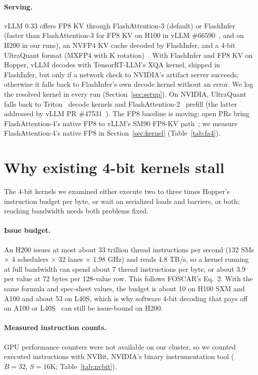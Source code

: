 \documentclass[11pt]{article}
\begin{document}
\paragraph{Serving.} vLLM 0.33 offers FP8 KV through FlashAttention-3 (default) or FlashInfer (faster than FlashAttention-3 for FP8 KV on H100 in vLLM \#66590~\cite{vllm66590}, and on H200 in our runs), an NVFP4 KV cache decoded by FlashInfer, and a 4-bit UltraQuant format (MXFP4 with K rotation)~\cite{chakrabarti2026ultraquant}. With FlashInfer and FP8 KV on Hopper, vLLM decodes with TensorRT-LLM's XQA kernel, shipped in FlashInfer, but only if a network check to NVIDIA's artifact server succeeds; otherwise it falls back to FlashInfer's own decode kernel without an error. We log the resolved kernel in every run (Section~\ref{sec:setup}). On NVIDIA, UltraQuant falls back to Triton~\cite{tillet2019triton} decode kernels and FlashAttention-2~\cite{dao2023flashattention2} prefill (the latter addressed by vLLM PR \#47531~\cite{vllm47531}). The FP8 baseline is moving: open PRs bring FlashAttention-4's native FP8 to vLLM's SM90 FP8-KV path~\cite{fa206,vllm63139}; we measure FlashAttention-4's native FP8 in Section~\ref{sec:kernel} (Table~\ref{tab:fa4}).

\section{Why existing 4-bit kernels stall}
\label{sec:stall}

The 4-bit kernels we examined either execute two to three times Hopper's instruction budget per byte, or wait on serialized loads and barriers, or both; reaching bandwidth needs both problems fixed.

\paragraph{Issue budget.} An H200 issues at most about 33 trillion thread instructions per second (132 SMs $\times$ 4 schedulers $\times$ 32 lanes $\times$ 1.98 GHz) and reads 4.8 TB/s, so a kernel running at full bandwidth can spend about 7 thread instructions per byte, or about 3.9 per value at 72 bytes per 128-value row. This follows FOSCAR's Eq.~2. With the same formula and spec-sheet values, the budget is about 10 on H100 SXM and A100 and about 53 on L40S, which is why software 4-bit decoding that pays off on A100 or L40S~\cite{lin2025qserve} can still be issue-bound on H200.

\paragraph{Measured instruction counts.} GPU performance counters were not available on our cluster, so we counted executed instructions with NVBit, NVIDIA's binary instrumentation tool ($B = 32$, $S = 16$K; Table~\ref{tab:nvbit}).
\end{document}
